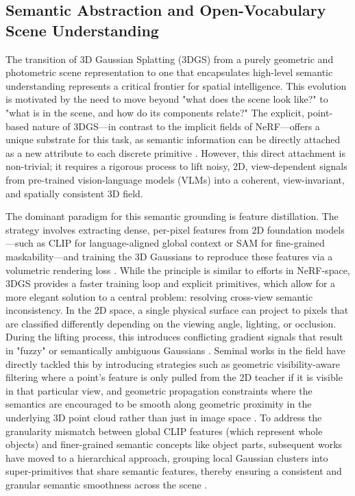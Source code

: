 \documentclass[11pt,a4paper]{article}
\begin{document}
\subsection{Semantic Abstraction and Open-Vocabulary Scene Understanding}


The transition of 3D Gaussian Splatting (3DGS) from a purely geometric and photometric scene representation to one that encapsulates high-level semantic understanding represents a critical frontier for spatial intelligence. This evolution is motivated by the need to move beyond "what does the scene look like?" to "what is in the scene, and how do its components relate?" The explicit, point-based nature of 3DGS---in contrast to the implicit fields of NeRF---offers a unique substrate for this task, as semantic information can be directly attached as a new attribute to each discrete primitive \cite{arxiv:2402.07181v1,arxiv:2508.09977v5}. However, this direct attachment is non-trivial; it requires a rigorous process to lift noisy, 2D, view-dependent signals from pre-trained vision-language models (VLMs) into a coherent, view-invariant, and spatially consistent 3D field.

The dominant paradigm for this semantic grounding is feature distillation. The strategy involves extracting dense, per-pixel features from 2D foundation models---such as CLIP for language-aligned global context or SAM for fine-grained maskability---and training the 3D Gaussians to reproduce these features via a volumetric rendering loss \cite{arxiv:2508.09977v5}. While the principle is similar to efforts in NeRF-space, 3DGS provides a faster training loop and explicit primitives, which allow for a more elegant solution to a central problem: resolving cross-view semantic inconsistency. In the 2D space, a single physical surface can project to pixels that are classified differently depending on the viewing angle, lighting, or occlusion. During the lifting process, this introduces conflicting gradient signals that result in "fuzzy" or semantically ambiguous Gaussians \cite{arxiv:2508.09977v5}. Seminal works in the field have directly tackled this by introducing strategies such as geometric visibility-aware filtering where a point's feature is only pulled from the 2D teacher if it is visible in that particular view, and geometric propagation constraints where the semantics are encouraged to be smooth along geometric proximity in the underlying 3D point cloud rather than just in image space \cite{arxiv:2508.09977v5}. To address the granularity mismatch between global CLIP features (which represent whole objects) and finer-grained semantic concepts like object parts, subsequent works have moved to a hierarchical approach, grouping local Gaussian clusters into super-primitives that share semantic features, thereby ensuring a consistent and granular semantic smoothness across the scene \cite{arxiv:2508.09977v5,arxiv:2401.03890v2}.
\end{document}
